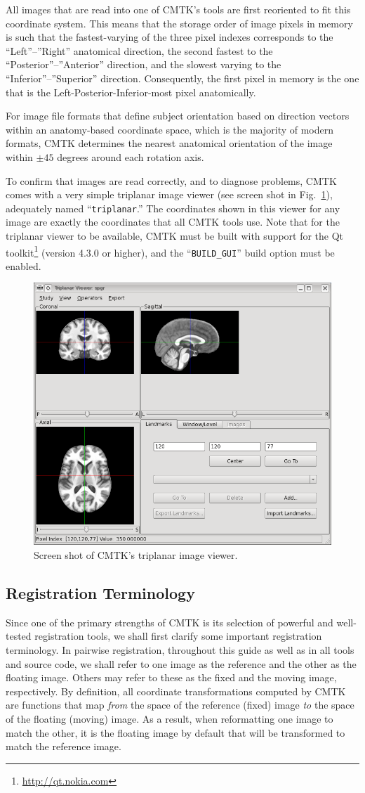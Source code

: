 \documentclass{InsightArticle}
\begin{document}
All images that are read into one of CMTK's tools are first reoriented to fit
this coordinate system. This means that the storage order of image pixels in
memory is such that the fastest-varying of the three pixel indexes corresponds
to the ``Left''--''Right'' anatomical direction, the second fastest to the
``Posterior''--''Anterior'' direction, and the slowest varying to the
``Inferior''--''Superior'' direction. Consequently, the first pixel in memory
is the one that is the Left-Posterior-Inferior-most pixel anatomically.

For image file formats that define subject orientation based on direction
vectors within an anatomy-based coordinate space, which is the majority of
modern formats, CMTK determines the nearest anatomical orientation of the
image within $\pm 45$ degrees around each rotation axis.

To confirm that images are read correctly, and to diagnose problems, CMTK
comes with a very simple triplanar image viewer (see screen shot in
Fig.~\ref{fig:triplanar}), adequately named ``\verb|triplanar|.'' The
coordinates shown in this viewer for any image are exactly the coordinates
that all CMTK tools use. Note that for the triplanar viewer to be available,
CMTK must be built with support for the Qt
toolkit\footnote{\url{http://qt.nokia.com}} (version 4.3.0 or higher), and the
``\verb|BUILD_GUI|'' build option must be enabled.

\begin{figure}[tbp]
\centerline{\includegraphics[width=.5\linewidth]{img/triplanar}}
\caption{Screen shot of CMTK's triplanar image viewer.}
\label{fig:triplanar}
\end{figure}

\subsection{Registration Terminology}

Since one of the primary strengths of CMTK is its selection of powerful and
well-tested registration tools, we shall first clarify some important
registration terminology. In pairwise registration, throughout this guide as
well as in all tools and source code, we shall refer to one image as the
reference and the other as the floating image. Others may refer to these as
the fixed and the moving image, respectively. By definition, all coordinate
transformations computed by CMTK are functions that map {\em from\/} the space
of the reference (fixed) image {\em to\/} the space of the floating (moving)
image. As a result, when reformatting one image to match the other, it is the
floating image by default that will be transformed to match the reference
image.
\end{document}
